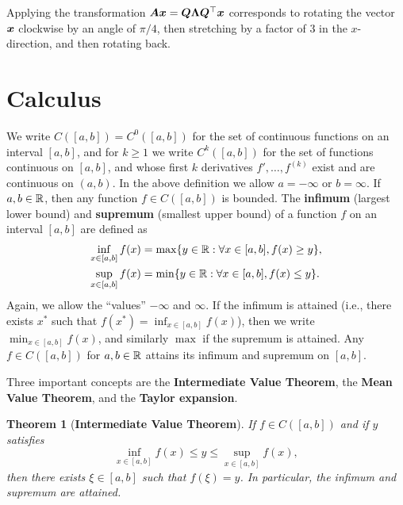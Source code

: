 \documentclass[11pt,a4paper]{memoir}
\newtheorem*{theorem*}{Theorem}
\begin{document}
\begin{example}
\begin{figure}[ht!]
\end{figure}

Applying the transformation $\bm{A}\bm{x} = \bm{Q}\bm{\Lambda}\bm{Q}^{\top}\bm{x}$ corresponds to rotating the vector $\bm{x}$ clockwise by an angle of $\pi/4$, then stretching by a factor of $3$ in the $x$-direction, and then rotating back.
\end{example}

\section{Calculus}
\setcounter{figure}{0}
We write $C([a,b])=C^0([a,b])$ for the set of continuous functions on an interval $[a,b]$, and for $k\geq 1$ we write $C^k([a,b])$ for the set of functions continuous on $[a,b]$, and whose first $k$ derivatives $f',\dots,f^{(k)}$ exist and are continuous on $(a,b)$. In the above definition we allow $a=-\infty$ or $b=\infty$. If $a,b\in \mathbb{R}$, then any function $f\in C([a,b])$ is bounded. The \strictpagecheck{}\textbf{infimum} (largest lower bound) and \textbf{supremum} (smallest upper bound) of a function $f$ on an interval $[a,b]$ are defined as
\begin{align*}
 \inf_{x\in [a,b]} f(x) &= \max\{y\in \mathbb{R} \mathrel{\mathop{:}} \forall x\in [a,b], f(x)\geq y\},\\
  \sup_{x\in [a,b]} f(x) &= \min\{y\in\mathbb{R} \mathrel{\mathop{:}} \forall x\in [a,b], f(x)\leq y\}.
\end{align*}
Again, we allow the ``values'' $-\infty$ and $\infty$. If the infimum is attained (i.e., there exists $x^*$ such that $f(x^*) = \inf_{x\in [a,b]} f(x)$), then we write $\min_{x\in [a,b]}f(x)$, and similarly $\max$ if the supremum is attained. Any $f\in C([a,b])$ for $a,b\in \mathbb{R}$ attains its infimum and supremum on $[a,b]$.

Three important concepts are the \textbf{Intermediate Value Theorem}, the \textbf{Mean Value Theorem}, and the \textbf{Taylor expansion}. 

\begin{theorem*}[\textbf{Intermediate Value Theorem}]
\strictpagecheck
{}If $f\in C([a,b])$ and if $y$ satisfies
\begin{equation*}
\inf_{x\in [a,b]} f(x)\leq y\leq \sup_{x\in [a,b]} f(x),
\end{equation*}
then there exists $\xi \in [a,b]$ such that $f(\xi)=y$. In particular, the infimum and supremum are attained.
\end{theorem*}
\end{document}
